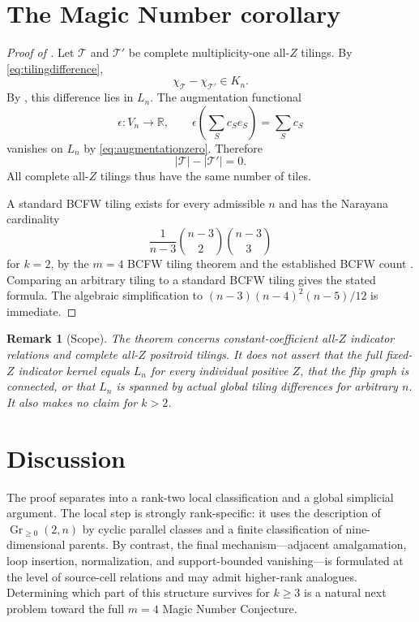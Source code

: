 \documentclass[11pt]{article}
\newtheorem{remark}[theorem]{Remark}
\newcommand{\Gr}{\operatorname{Gr}}
\newcommand{\R}{\mathbb R}
\newcommand{\1}{\mathbf 1}
\begin{document}
\section{The Magic Number corollary}
\label{sec:magic}

\begin{proof}[Proof of ]
Let $\mathcal T$ and $\mathcal T'$ be complete multiplicity-one all-$Z$
tilings.  By \eqref{eq:tilingdifference},
\[
\chi_{\mathcal T}-\chi_{\mathcal T'}\in K_n.
\]
By , this difference lies in $L_n$.  The augmentation
functional
\[
\epsilon:V_n\to\R,\qquad
\epsilon\!\left(\sum_S c_Se_S\right)=\sum_S c_S
\]
vanishes on $L_n$ by \eqref{eq:augmentationzero}.  Therefore
\[
|\mathcal T|-|\mathcal T'|=0.
\]
All complete all-$Z$ tilings thus have the same number of tiles.

A standard BCFW tiling exists for every admissible $n$ and has the Narayana
cardinality
\[
\frac{1}{n-3}\binom{n-3}{2}\binom{n-3}{3}
\]
for $k=2$, by the $m=4$ BCFW tiling theorem and the established BCFW count
\cite{KWZ,BCFWCluster}.  Comparing an arbitrary tiling to a standard BCFW
tiling gives the stated formula.  The algebraic simplification to
$(n-3)(n-4)^2(n-5)/12$ is immediate.
\end{proof}

\begin{remark}[Scope]
The theorem concerns constant-coefficient all-$Z$ indicator relations and
complete all-$Z$ positroid tilings.  It does not assert that the full
fixed-$Z$ indicator kernel equals $L_n$ for every individual positive
$Z$, that the flip graph is connected, or that $L_n$ is spanned by actual
global tiling differences for arbitrary $n$.  It also makes no claim for
$k>2$.
\end{remark}

\section{Discussion}

The proof separates into a rank-two local classification and a global
simplicial argument.  The local step is strongly rank-specific: it uses
the description of $\Gr_{\ge0}(2,n)$ by cyclic parallel classes and a
finite classification of nine-dimensional parents.  By contrast, the
final mechanism---adjacent amalgamation, loop insertion, normalization,
and support-bounded vanishing---is formulated at the level of source-cell
relations and may admit higher-rank analogues.  Determining which part of
this structure survives for $k\ge3$ is a natural next problem toward the
full $m=4$ Magic Number Conjecture.
\end{document}
